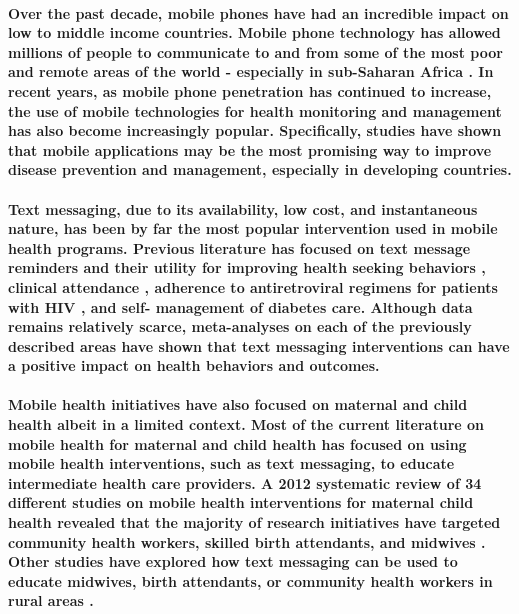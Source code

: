 \paragraph{Over the past decade, mobile phones have had an incredible impact on low to middle income countries. Mobile phone technology has allowed millions of people to communicate to and from some of the most poor and remote areas of the world - especially in sub-Saharan Africa \citep{Adler2007}. In recent years, as mobile phone penetration has continued to increase, the use of mobile technologies for health monitoring and management has also become increasingly popular. Specifically, studies have shown that mobile applications may be the most promising way to improve disease prevention and management, especially in developing countries\citep{ColeLewis2010}.}

\paragraph{Text messaging, due to its availability, low cost, and instantaneous nature, has been by far the most popular intervention used in mobile health programs. Previous literature has focused on text message reminders and their utility for improving health seeking behaviors \citep{ColeLewis2010}, clinical attendance \citep{Guy2012},  adherence to antiretroviral regimens for patients with HIV \citep{Horvath2012}, and self- management of diabetes care\citep{Krishna2008}. Although data remains relatively scarce, meta-analyses on each of the previously described areas have shown that text messaging interventions can have a positive impact on health behaviors and outcomes.}

\paragraph{Mobile health initiatives have also focused on maternal and child health albeit in a limited context. Most of the current literature on mobile health for maternal and child health has focused on using mobile health interventions, such as text messaging, to educate intermediate health care providers. A 2012 systematic review of 34 different studies on mobile health interventions for maternal child health revealed that the majority of research initiatives have targeted community health workers, skilled birth attendants, and midwives \citep{Tamrat2012}. Other studies have explored how text messaging can be used to educate midwives, birth attendants, or community health workers in rural areas \citep{Woods2012}.}

